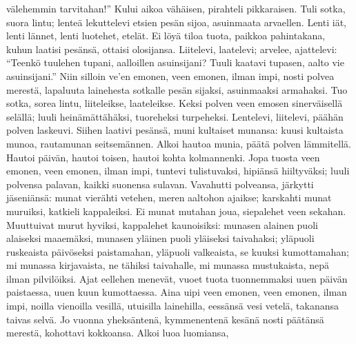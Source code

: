     välehemmin tarvitahan!''
  \endverse
  \beginverse
    Kului aikoa vähäisen,
    pirahteli pikkaraisen.
    Tuli sotka, suora lintu;
    lenteä lekuttelevi
  \endverse
  \beginverse
    etsien pesän sijoa,
    asuinmaata arvaellen.
    Lenti iät, lenti lännet,
    lenti luotehet, etelät.
    Ei löyä tiloa tuota,
    paikkoa pahintakana,
    kuhun laatisi pesänsä,
    ottaisi olosijansa.
  \endverse
  \beginverse
    Liitelevi, laatelevi;
    arvelee, ajattelevi:
  \endverse
  \beginverse
    ``Teenkö tuulehen tupani,
    aalloillen asuinsijani?
    Tuuli kaatavi tupasen,
    aalto vie asuinsijani.''
    Niin silloin ve'en emonen,
    veen emonen, ilman impi,
    nosti polvea merestä,
    lapaluuta lainehesta
    sotkalle pesän sijaksi,
    asuinmaaksi armahaksi.
  \endverse
  \beginverse
    Tuo sotka, sorea lintu,
    liiteleikse, laateleikse.
    Keksi polven veen emosen
    sinerväisellä selällä;
    luuli heinämättähäksi,
    tuoreheksi turpeheksi.
    Lentelevi, liitelevi,
    päähän polven laskeuvi.
    Siihen laativi pesänsä,
    muni kultaiset munansa:
  \endverse
  \beginverse
    kuusi kultaista munoa,
    rautamunan seitsemännen.
  \endverse
  \beginverse
    Alkoi hautoa munia,
    päätä polven lämmitellä.
    Hautoi päivän, hautoi toisen,
    hautoi kohta kolmannenki.
    Jopa tuosta veen emonen,
    veen emonen, ilman impi,
    tuntevi tulistuvaksi,
    hipiänsä hiiltyväksi;
  \endverse
  \beginverse
    luuli polvensa palavan,
    kaikki suonensa sulavan.
    Vavahutti polveansa,
    järkytti jäseniänsä:
    munat vierähti vetehen,
    meren aaltohon ajaikse;
    karskahti munat muruiksi,
    katkieli kappaleiksi.
  \endverse
  \beginverse
    Ei munat mutahan joua,
    siepalehet veen sekahan.
  \endverse
  \beginverse
    Muuttuivat murut hyviksi,
    kappalehet kaunoisiksi:
    munasen alainen puoli
    alaiseksi maaemäksi,
    munasen yläinen puoli
    yläiseksi taivahaksi;
    yläpuoli ruskeaista
    päivöseksi paistamahan,
    yläpuoli valkeaista,
    se kuuksi kumottamahan;
    mi munassa kirjavaista,
    ne tähiksi taivahalle,
    mi munassa mustukaista,
    nepä ilman pilvilöiksi.
  \endverse
  \beginverse
    Ajat eellehen menevät,
    vuoet tuota tuonnemmaksi
    uuen päivän paistaessa,
    uuen kuun kumottaessa.
    Aina uipi veen emonen,
    veen emonen, ilman impi,
  \endverse
  \beginverse
    noilla vienoilla vesillä,
    utuisilla lainehilla,
    eessänsä vesi vetelä,
    takanansa taivas selvä.
    Jo vuonna yheksäntenä,
    kymmenentenä kesänä
    nosti päätänsä merestä,
    kohottavi kokkoansa.
    Alkoi luoa luomiansa,
